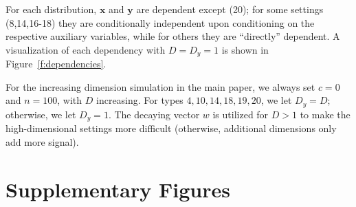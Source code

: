 \documentclass[11pt]{article}
\providecommand{\sct}[1]{{\normalfont\textsc{#1}}}
\providecommand{\mb}[1]{\boldsymbol{#1}}
\newcommand{\Real}{\mathbb{R}}
\newcommand{\Mgc}{\sct{Mgc}}
\newcommand{\Dcorr}{\sct{Dcorr}}
\newcommand{\Mcorr}{\sct{Mcorr}}
\newcommand{\mby}{\ensuremath{\mb{y}}}
\begin{document}
For each distribution, $\mb{x}$ and $\mb{y}$ are dependent except  (20); for some settings (8,14,16-18) they are conditionally independent upon conditioning on the respective auxiliary variables, while for others they are
 ``directly'' dependent. 
A visualization of each dependency with $D=D_y=1$ is shown in Figure~\ref{f:dependencies}.


For the increasing dimension simulation in the main paper, we always set $c=0$ and $n=100$, with $D$ increasing.  For types  $4,10,14,18,19,20$, we let $D_y=D$; otherwise, we let $D_y=1$. 
The decaying vector $w$ is utilized for $D>1$ to make the high-dimensional settings more difficult (otherwise, additional dimensions only add more signal).


\section{Supplementary Figures}
\label{appen:figs}

\end{document}
